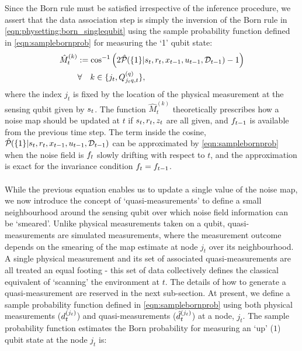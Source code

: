 Since the Born rule must be satisfied irrespective of the inference procedure, we assert that the data association step is simply the inversion of the Born rule in \cref{eqn:physetting:born_singlequbit} using the sample probability function defined in \cref{eqn:samplebornprob} for measuring the `1' qubit state:
\begin{align}
\hat{M}_t^{(k)} &:= \cos^{-1}\left( 2\hat{\mathcal{P}}_{} (\{1\} | s_{ t}, r_{ t}, x_{t-1}, u_{t-1}, \mathcal{D}_{t-1}) - 1 \right) \label{eqn:physetting:mapdatassoc:2} \\
& \forall \quad  k \in \{j_t, Q^{( q )}_{j_t q, t } \}, \nonumber 
\end{align} where the index $j_t$  is fixed by the location of the physical measurement at the sensing qubit  given by $s_{ t}$. The function  $\hat{M}_t^{(k)}$ theoretically prescribes how a noise map should be updated at $t$ if $s_{ t}, r_{ t}, z_t$ are all given, and $f_{ t-1}$ is available from the previous time step. The term inside the cosine, $\hat{\mathcal{P}}_{} (\{1\} | s_{ t}, r_{ t}, x_{t-1}, u_{t-1}, \mathcal{D}_{t-1})$ can be approximated by \cref{eqn:samplebornprob} when the noise field is $f_{ t}$ slowly drifting with respect to $t$, and the approximation is exact for the invariance condition $f_{ t} = f_{ t-1}$.\\
\\
While the previous equation enables us to update a single value of the noise map, we now introduce the concept of `quasi-measurements' to define a small neighbourhood around the sensing qubit over which noise field information can be `smeared'. Unlike physical measurements taken on a qubit, quasi-measurements are simulated measurements, where the measurement outcome depends on the smearing of the map estimate at node $j_t$ over its neighbourhood. A single physical measurement and its set of associated quasi-measurements are all treated an equal footing - this set of data collectively defines the classical equivalent of `scanning' the environment at $t$. The details of how to generate a quasi-measurement are reserved in the next sub-section. At present, we define  a sample probability function defined in \cref{eqn:samplebornprob} using both physical measurements ($d^{( j_t )}_{t}$) and quasi-measurements ($\hat{d}^{( j_t )}_{t}$) at a node, $j_t$. The sample probability function estimates the Born probability for measuring an `up' ($1$) qubit state at the node $j_t$ is:
